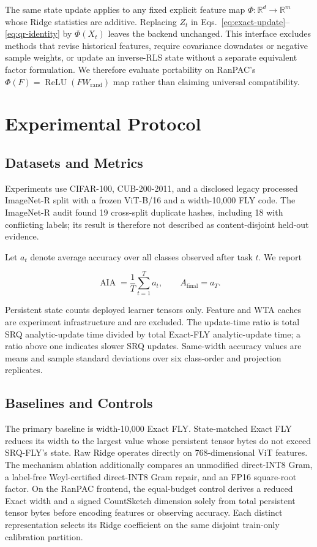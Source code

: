 \documentclass[runningheads]{llncs}
\begin{document}
The same state update applies to any fixed explicit feature map
$\Phi:\mathbb{R}^{d}\rightarrow\mathbb{R}^{m}$ whose Ridge statistics are
additive. Replacing $Z_t$ in Eqs.~\ref{eq:exact-update}--\ref{eq:qr-identity}
by $\Phi(X_t)$ leaves the backend unchanged. This interface excludes methods
that revise historical features, require covariance downdates or negative
sample weights, or update an inverse-RLS state without a separate equivalent
factor formulation. We therefore evaluate portability on RanPAC's
$\Phi(F)=\operatorname{ReLU}(FW_{\mathrm{rand}})$ map rather than claiming
universal compatibility.

\section{Experimental Protocol}

\subsection{Datasets and Metrics}

Experiments use CIFAR-100, CUB-200-2011, and a disclosed legacy processed
ImageNet-R split with a frozen ViT-B/16 and a width-10,000 FLY code. The
ImageNet-R audit found 19 cross-split duplicate hashes, including 18 with
conflicting labels; its result is therefore not described as content-disjoint
held-out evidence.

Let $a_t$ denote average accuracy over all classes observed after task $t$.
We report

\begin{equation}
\operatorname{AIA}=\frac{1}{T}\sum_{t=1}^{T}a_t,
\qquad A_{\mathrm{final}}=a_T.
\label{eq:metrics}
\end{equation}

Persistent state counts deployed learner tensors only. Feature and WTA caches
are experiment infrastructure and are excluded. The update-time ratio is total
SRQ analytic-update time divided by total Exact-FLY analytic-update time; a
ratio above one indicates slower SRQ updates. Same-width accuracy values are
means and sample standard deviations over six class-order and projection
replicates.

\subsection{Baselines and Controls}

The primary baseline is width-10,000 Exact FLY. State-matched Exact FLY reduces
its width to the largest value whose persistent tensor bytes do not exceed
SRQ-FLY's state. Raw Ridge operates directly on 768-dimensional ViT features.
The mechanism ablation additionally compares an unmodified direct-INT8 Gram,
a label-free Weyl-certified direct-INT8 Gram repair, and an FP16 square-root
factor. On the RanPAC frontend, the equal-budget control derives a reduced
Exact width and a signed CountSketch dimension solely from total persistent
tensor bytes before encoding features or observing accuracy. Each distinct
representation selects its Ridge coefficient on the same disjoint train-only
calibration partition.
\end{document}
